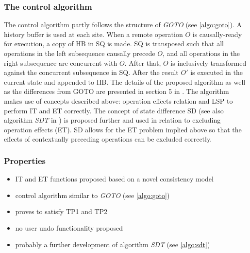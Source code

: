 \subsubsection{The control algorithm}
The control algorithm partly follows the structure of \emph{GOTO} (see \ref{algo:goto}). A history buffer is used at each site. When a remote operation $O$ is causally-ready for execution, a copy of HB in SQ is made. SQ is transposed such that all operations in the left subsequence causally precede $O$, and all operations in the right subsequence are concurrent with $O$. After that, $O$ is inclusively transformed against the concurrent subsequence in SQ. After the result $O'$ is executed in the current state and appended to HB. The details of the proposed algorithm as well as the differences from GOTO are presented in section 5 in \cite{li04}. The algorithm makes use of concepts described above: operation effects relation and LSP to perform IT and ET correctly. The concept of state difference SD (see also algorithm \emph{SDT} in \cite{sdt}) is proposed further and used in relation to excluding operation effects (ET). SD allows for the ET problem implied above so that the effects of contextually preceding operations can be excluded correctly.

\subsubsection{Properties}
\begin{itemize}
 \item IT and ET functions proposed based on a novel consistency model
 \item control algorithm similar to \emph{GOTO} (see \ref{algo:goto})
 \item proves to satisfy TP1 and TP2
 \item no user undo functionality proposed
 \item probably a further development of algorithm \emph{SDT} (see \ref{algo:sdt})
\end{itemize}
